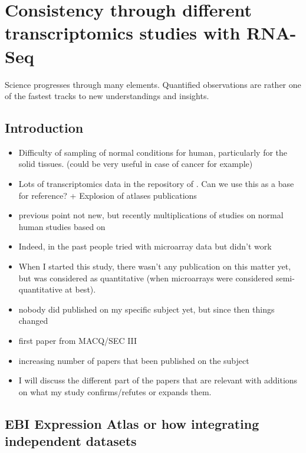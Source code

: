 \chapter{Consistency through different transcriptomics studies with RNA-Seq}
\label{ch:Transcriptomics}



Science progresses through many elements. Quantified observations are rather one
of the fastest tracks to new understandings and insights.

\section{Introduction}

\begin{itemize}
    \item Difficulty of sampling of normal conditions for human, particularly
        for the solid tissues. (could be very useful in case of cancer for
        example)
    \item Lots of transcriptomics data in the repository of \EBI{}. Can we use
        this as a base for reference? + Explosion of atlases publications
    \item previous point not new, but recently multiplications of studies on
        normal human studies based on \Rnaseq
    \item Indeed, in the past people tried with microarray data but didn't work
    \item When I started this study, there wasn't any publication on this matter
        yet, but \Rnaseq was considered as quantitative (when microarrays were
        considered semi-quantitative at best).
    \item nobody did published on my specific subject yet, but since then things changed
    \item first paper from MACQ/SEC III
    \item increasing number of papers that been published on the subject
    \item I will discuss the different part of the papers that are relevant
        with additions on what my study confirms/refutes or expands them.
\end{itemize}

\section{EBI Expression Atlas or how integrating independent datasets }

